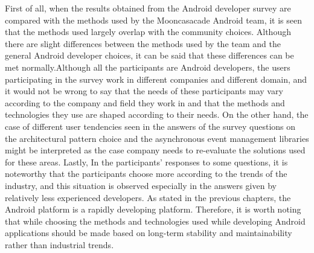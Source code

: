 First of all, when the results obtained from the Android developer survey are compared with the methods used by the Mooncasacade Android team, it is seen that the methods used largely overlap with the community choices. Although there are slight differences between the methods used by the team and the general Android developer choices, it can be said that these differences can be met normally.Although all the participants are Android developers, the users participating in the survey work in different companies and different domain, and it would not be wrong to say that the needs of these participants may vary according to the company and field they work in and that the methods and technologies they use are shaped according to their needs. On the other hand, the case of different user tendencies seen in the answers of the survey questions on the architectural pattern choice and the asynchronous event management libraries might be interpreted as the case company needs to re-evaluate the solutions used for these areas. Lastly, In the participants' responses to some questions, it is noteworthy that the participants choose more according to the trends of the industry, and this situation is observed especially in the answers given by relatively less experienced developers. As stated in the previous chapters, the Android platform is a rapidly developing platform. Therefore, it is worth noting that while choosing the methods and technologies used while developing Android applications should be made based on long-term stability and maintainability rather than industrial trends.

